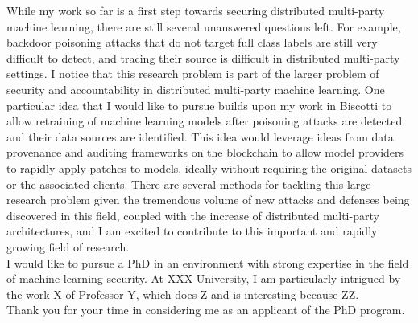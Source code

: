 \documentclass[10pt]{article} %
\begin{document}
While my work so far is a first step towards securing distributed multi-party machine learning, there are still several unanswered questions left. For example, backdoor poisoning attacks that do not target full class labels are still very difficult to detect, and tracing their source is difficult in distributed multi-party settings. I notice that this research problem is part of the larger problem of security and accountability in distributed multi-party machine learning. One particular idea that I would like to pursue builds upon my work in Biscotti to allow retraining of machine learning models after poisoning attacks are detected and their data sources are identified. This idea would leverage ideas from data provenance and auditing frameworks on the blockchain to allow model providers to rapidly apply patches to models, ideally without requiring the original datasets or the associated clients. There are several methods for tackling this large research problem given the tremendous volume of new attacks and defenses being discovered in this field, coupled with the increase of distributed multi-party architectures, and I am excited to contribute to this important and rapidly growing field of research. \\

I would like to pursue a PhD in an environment with strong expertise in the field of machine learning security. At XXX University, I am particularly intrigued by the work X of Professor Y, which does Z and is interesting because ZZ. \\

Thank you for your time in considering me as an applicant of the PhD program.
\end{document}
